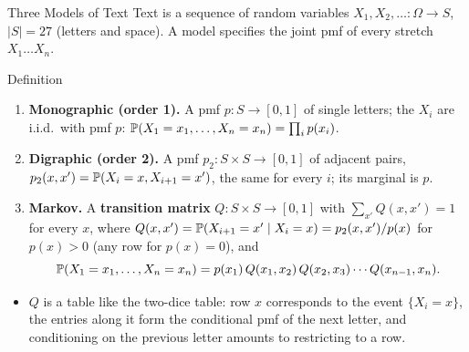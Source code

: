 \begin{frame}{Three Models of Text}
  \small
  Text is a sequence of random variables $X_1,X_2,\dots\colon\Omega\to S$, $|S|=27$ (letters and space). A model specifies the joint pmf of every stretch $X_1\dots X_n$.
  \begin{block}{Definition}
    \begin{enumerate}
      \item \textbf{Monographic (order 1).} A pmf $p\colon S\to[0,1]$ of single letters; the $X_i$ are i.i.d.\ with pmf $p$: $\mathbb{P}(X_1=x_1,\dots,X_n=x_n)=\prod_ip(x_i)$.
      \item \textbf{Digraphic (order 2).} A pmf $p_2\colon S\times S\to[0,1]$ of adjacent pairs, $p_2(x,x')=\mathbb{P}(X_i=x,X_{i+1}=x')$, the same for every $i$; its marginal is $p$.
      \item \textbf{Markov.} A \textbf{transition matrix} $Q\colon S\times S\to[0,1]$ with $\sum_{x'}Q(x,x')=1$ for every $x$, where $Q(x,x')=\mathbb{P}(X_{i+1}=x'\mid X_i=x)=p_2(x,x')/p(x)$ for $p(x)>0$ (any row for $p(x)=0$), and
        \[
          \mathbb{P}(X_1=x_1,\dots,X_n=x_n)=p(x_1)\,Q(x_1,x_2)\,Q(x_2,x_3)\cdots Q(x_{n-1},x_n).
        \]
    \end{enumerate}
  \end{block}
  \begin{itemize}
    \item $Q$ is a table like the two-dice table: row $x$ corresponds to the event $\{X_i=x\}$, the entries along it form the conditional pmf of the next letter, and conditioning on the previous letter amounts to restricting to a row.
  \end{itemize}
\end{frame}

